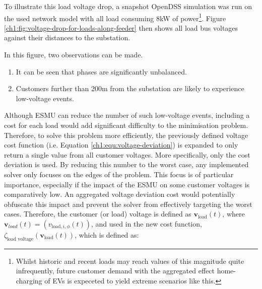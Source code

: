 To illustrate this load voltage drop, a snapshot OpenDSS simulation was run on the used network model with all load consuming  8kW of power\footnote[1]{Whilst historic and recent loads may reach values of this magnitude quite infrequently, future customer demand with the aggregated effect home-charging of EVs is expeceted to yield extreme scenarios like this.}.
Figure \ref{ch1:fig:voltage-drop-for-loads-along-feeder} then shows all load bus voltages against their distances to the substation.




In this figure, two observations can be made.

\begin{enumerate}
	\item It can be seen that phases are significantly unbalanced. 
	\item Customers further than 200m from the substation are likely to experience low-voltage events.
\end{enumerate}

Although ESMU can reduce the number of such low-voltage events, including a cost for each load would add significant difficulty to the minimisation problem.
Therefore, to solve this problem more efficiently, the previously defined voltage cost function (i.e. Equation \ref{ch1:equ:voltage-deviation}) is expanded to only return a single value from all customer voltages.
More specifically, only the cost deviation is used.
By reducing this number to the worst case, any implemented solver only focuses on the edges of the problem.
This focus is of particular importance, especially if the impact of the ESMU on some customer voltages is comparatively low.
An aggregated voltage deviation cost would potentially obfuscate this impact and prevent the solver from effectively targeting the worst cases.
Therefore, the customer (or load) voltage is defined as $\textbf{v}_\text{load}(t)$, where $\textbf{v}_{load}(t) = (v_{\text{load},i,\phi}(t))$, and used in the new cost function, $\zeta_\text{load voltage}(\textbf{v}_\text{load}(t))$, which is defined as:

